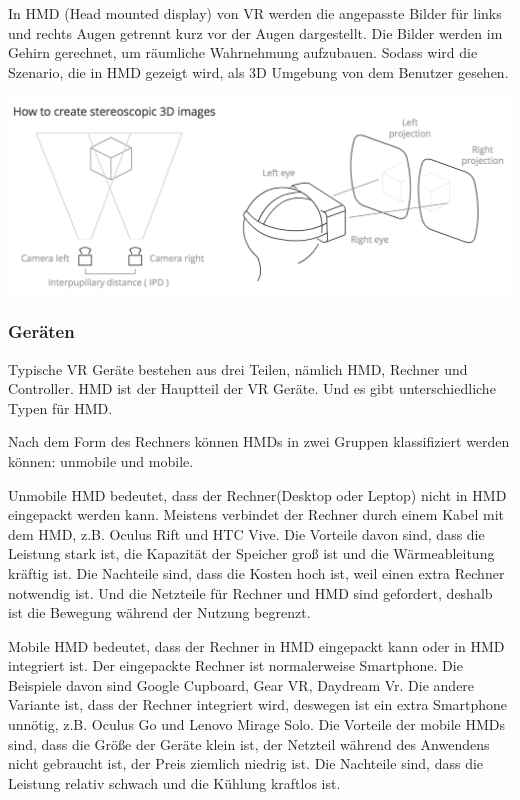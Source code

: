 In HMD (Head mounted display) von VR werden die angepasste Bilder für links und rechts Augen getrennt kurz vor der Augen dargestellt. Die Bilder werden im Gehirn gerechnet, um räumliche Wahrnehmung aufzubauen. Sodass wird die Szenario, die in HMD gezeigt wird, als 3D Umgebung von dem Benutzer gesehen.

\includegraphics[width=\textwidth]{images/howToCreate.png}

  \subsubsection{Geräten}
  Typische VR Geräte bestehen aus drei Teilen, nämlich HMD, Rechner und Controller. HMD ist der Hauptteil der VR Geräte. Und es gibt unterschiedliche Typen für HMD.
  
  Nach dem Form des Rechners können HMDs in zwei Gruppen klassifiziert werden können: unmobile und mobile.
  
  Unmobile HMD bedeutet, dass der Rechner(Desktop oder Leptop) nicht in HMD eingepackt werden kann. Meistens verbindet der Rechner durch einem Kabel mit dem HMD, z.B. Oculus Rift und HTC Vive. Die Vorteile davon sind, dass die Leistung stark ist, die Kapazität der Speicher groß ist und die Wärmeableitung kräftig ist. Die Nachteile sind, dass die Kosten hoch ist, weil einen extra Rechner notwendig ist. Und die Netzteile für Rechner und HMD sind gefordert, deshalb ist die Bewegung während der Nutzung begrenzt.
  
  Mobile HMD bedeutet, dass der Rechner in HMD eingepackt kann oder in HMD integriert ist. Der eingepackte Rechner ist normalerweise Smartphone. Die Beispiele davon sind Google Cupboard, Gear VR, Daydream Vr. Die andere Variante ist, dass der Rechner integriert wird, deswegen ist ein extra Smartphone unnötig, z.B. Oculus Go und Lenovo Mirage Solo. Die Vorteile der mobile HMDs sind, dass die Größe der Geräte klein ist, der Netzteil während des Anwendens nicht gebraucht ist, der Preis ziemlich niedrig ist. Die Nachteile sind, dass die Leistung relativ schwach und die Kühlung kraftlos ist.
  
